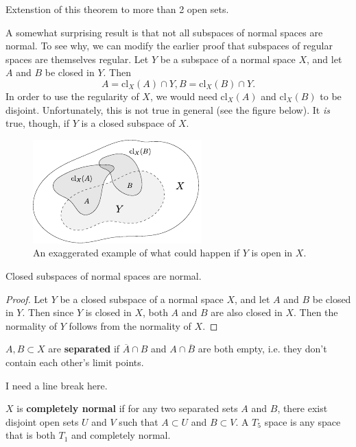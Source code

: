 \documentclass[10pt]{report}
\begin{document}
{\color{red}Extenstion of this theorem to more than 2 open sets.}

A somewhat surprising result is that not all subspaces of normal spaces are normal. To see why, we can modify the earlier proof that subspaces of regular spaces are themselves regular. Let $Y$ be a subspace of a normal space $X$, and let $A$ and $B$ be closed in $Y$. Then
\[
	A= \text{cl}_X(A) \cap Y, B = \text{cl}_X(B) \cap Y.
\] In order to use the regularity of $X$, we would need $\text{cl}_X(A)$ and $\text{cl}_X(B)$ to be disjoint. Unfortunately, this is not true in general (see the figure below). It \textit{is} true, though, if $Y$ is a closed subspace of $X$.

\begin{figure}[H]
	\centering
	\includegraphics[scale=2]{fig/normal-counter.pdf}
	\caption{An exaggerated example of what could happen if $Y$ is open in $X$.}
\end{figure}


\begin{prop}
Closed subspaces of normal spaces are normal.
\end{prop}
\begin{proof}
	Let $Y$ be a closed subspace of a normal space $X$, and let $A$ and $B$ be closed in $Y$. Then since $Y$ is closed in $X$, both $A$ and $B$ are also closed in $X$. Then the normality of $Y$ follows from the normality of $X$.
\end{proof}

\begin{defn}
$A,B \subset X$ are \textbf{separated} if $\overline{A}\cap B$ and $A \cap \overline{B}$ are both empty, i.e. they don't contain each other's limit points.
\end{defn}

{\color{red}I need a line break here.}

\begin{defn}
$X$ is \textbf{completely normal} if for any two separated sets $A$ and $B$, there exist disjoint open sets $U$ and $V$ such that $A \subset U$ and $B \subset V$. A $T_5$ space is any space that is both $T_1$ and completely normal.
\end{defn}
\end{document}
